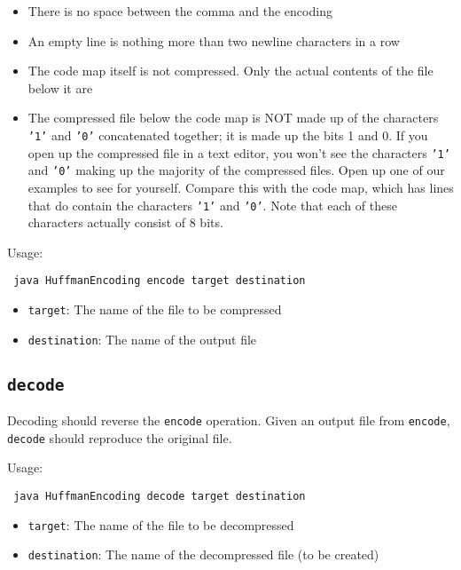 \documentclass[11pt]{article}
\begin{document}
\begin{itemize}
\item There is no space between the comma and the encoding
\item An empty line is nothing more than two newline characters in a row
\item The code map itself is not compressed. Only the actual contents of the file below it are
\item The compressed file below the code map is NOT made up of the characters \texttt{'1'} and \texttt{'0'} concatenated together; it is made up the bits 1 and 0. If you open up the compressed file in a text editor, you won't see the characters \texttt{'1'} and \texttt{'0'} making up the majority of the compressed files. Open up one of our examples to see for yourself. Compare this with the code map, which has lines that do contain the characters \texttt{'1'} and \texttt{'0'}. Note that each of these characters actually consist of 8 bits.
\end{itemize}

Usage:
\begin{center}
\texttt{
java HuffmanEncoding encode target destination
}
\end{center}

\begin{itemize}
\item \texttt{target}: The name of the file to be compressed
\item \texttt{destination}: The name of the output file
\end{itemize}

\subsection*{\texttt{decode}}
Decoding should reverse the \texttt{encode} operation. Given an output file from \texttt{encode}, \texttt{decode} should reproduce the original file.

Usage:
\begin{center}
\texttt{
java HuffmanEncoding decode target destination
}
\end{center}

\begin{itemize}
\item \texttt{target}: The name of the file to be decompressed
\item \texttt{destination}: The name of the decompressed file (to be created)
\end{itemize}
\end{document}
